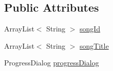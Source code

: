 \subsection*{\-Public \-Attributes}
\begin{DoxyCompactItemize}
\item 
\-Array\-List$<$ \-String $>$ \hyperlink{classcom_1_1axcoto_1_1shinjuku_1_1sushi_1_1_song_activity_a46dd2375b54b76b1942d6917fd0b01d1}{song\-Id}
\item 
\-Array\-List$<$ \-String $>$ \hyperlink{classcom_1_1axcoto_1_1shinjuku_1_1sushi_1_1_song_activity_abb3e113934ebcb4090cec7c75a299f76}{song\-Title}
\item 
\-Progress\-Dialog \hyperlink{classcom_1_1axcoto_1_1shinjuku_1_1sushi_1_1_song_activity_a1d5efa5914b65e5097867ea92779c501}{progress\-Dialog}
\end{DoxyCompactItemize}
